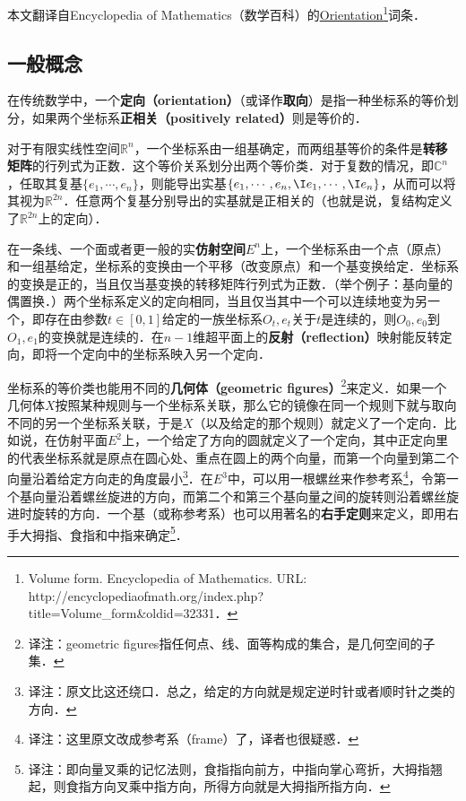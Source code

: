 
本文翻译自Encyclopedia of Mathematics（数学百科）的\href{https://encyclopediaofmath.org/wiki/Orientation}{Orientation}\footnote{Volume form. Encyclopedia of Mathematics. URL: http://encyclopediaofmath.org/index.php?title=Volume_form&oldid=32331．}词条．

\subsection{一般概念}

在传统数学中，一个\textbf{定向（orientation）}（或译作\textbf{取向}）是指一种坐标系的等价划分，如果两个坐标系\textbf{正相关（positively related）}则是等价的．

对于有限实线性空间$\mathbb{R}^n$，一个坐标系由一组基确定，而两组基等价的条件是\textbf{转移矩阵}的行列式为正数．这个等价关系划分出两个等价类．对于复数的情况，即$\mathbb{C}^n$，任取其复基$\{e_1, \cdots, e_n\}$，则能导出实基$\{e_1, \cdots, e_n, \I e_1, \cdots, \I e_n\}$，从而可以将其视为$\mathbb{R}^{2n}$．任意两个复基分别导出的实基就是正相关的（也就是说，复结构定义了$\mathbb{R}^{2n}$上的定向）．

在一条线、一个面或者更一般的实\textbf{仿射空间}$E^n$上，一个坐标系由一个点（原点）和一组基给定，坐标系的变换由一个平移（改变原点）和一个基变换给定．坐标系的变换是正的，当且仅当基变换的转移矩阵行列式为正数．（举个例子：基向量的偶置换．）两个坐标系定义的定向相同，当且仅当其中一个可以连续地变为另一个，即存在由参数$t\in[0, 1]$给定的一族坐标系$O_t, e_t$关于$t$是连续的，则$O_0, e_0$到$O_1, e_1$的变换就是连续的．在$n-1$维超平面上的\textbf{反射（reflection）}映射能反转定向，即将一个定向中的坐标系映入另一个定向．

坐标系的等价类也能用不同的\textbf{几何体（geometric figures）}\footnote{译注：geometric figures指任何点、线、面等构成的集合，是几何空间的子集．}来定义．如果一个几何体$X$按照某种规则与一个坐标系关联，那么它的镜像在同一个规则下就与取向不同的另一个坐标系关联，于是$X$（以及给定的那个规则）就定义了一个定向．比如说，在仿射平面$E^2$上，一个给定了方向的圆就定义了一个定向，其中正定向里的代表坐标系就是原点在圆心处、重点在圆上的两个向量，而第一个向量到第二个向量沿着给定方向走的角度最小\footnote{译注：原文比这还绕口．总之，给定的方向就是规定逆时针或者顺时针之类的方向．}．在$E^3$中，可以用一根螺丝来作参考系\footnote{译注：这里原文改成参考系（frame）了，译者也很疑惑．}，令第一个基向量沿着螺丝旋进的方向，而第二个和第三个基向量之间的旋转则沿着螺丝旋进时旋转的方向．一个基（或称参考系）也可以用著名的\textbf{右手定则}来定义，即用右手大拇指、食指和中指来确定\footnote{译注：即向量叉乘的记忆法则，食指指向前方，中指向掌心弯折，大拇指翘起，则食指方向叉乘中指方向，所得方向就是大拇指所指方向．}．

